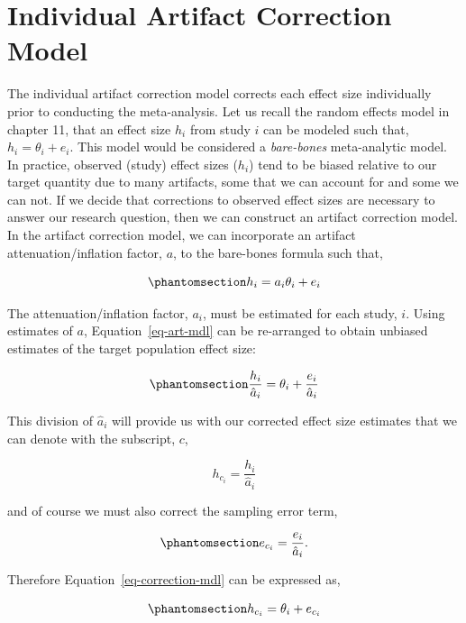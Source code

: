 \documentclass[
  letterpaper,
  DIV=11,
  numbers=noendperiod]{scrreprt}
\begin{document}
\section{Individual Artifact Correction
Model}\label{individual-artifact-correction-model}

The individual artifact correction model corrects each effect size
individually prior to conducting the meta-analysis. Let us recall the
random effects model in chapter 11, that an effect size \(h_i\) from
study \(i\) can be modeled such that, \(h_i=\theta_i+e_i\). This model
would be considered a \emph{bare-bones} meta-analytic model. In
practice, observed (study) effect sizes (\(h_i\)) tend to be biased
relative to our target quantity due to many artifacts, some that we can
account for and some we can not. If we decide that corrections to
observed effect sizes are necessary to answer our research question,
then we can construct an artifact correction model. In the artifact
correction model, we can incorporate an artifact attenuation/inflation
factor, \(a\), to the bare-bones formula such that,

\begin{equation}\phantomsection\label{eq-art-mdl}{
h_{i} = a_i\theta_i + e_i
}\end{equation}

The attenuation/inflation factor, \(a_i\), must be estimated for each
study, \(i\). Using estimates of \(a\), Equation~\ref{eq-art-mdl} can be
re-arranged to obtain unbiased estimates of the target population effect
size:

\begin{equation}\phantomsection\label{eq-correction-mdl}{
\frac{h_i}{\hat{a}_i} = \theta_i + \frac{e_i}{\hat{a}_i}
}\end{equation}

This division of \(\hat{a}_i\) will provide us with our corrected effect
size estimates that we can denote with the subscript, \(c\),

\[
h_{c_i} = \frac{h_{i}}{\hat{a}_i}
\]

and of course we must also correct the sampling error term,

\begin{equation}\phantomsection\label{eq-error}{
e_{c_i} = \frac{e_{i}}{\hat{a}_i}.
}\end{equation}

Therefore Equation~\ref{eq-correction-mdl} can be expressed as,

\begin{equation}\phantomsection\label{eq-correction-formula}{
h_{c_i} = \theta_i + e_{c_i} 
}\end{equation}
\end{document}

